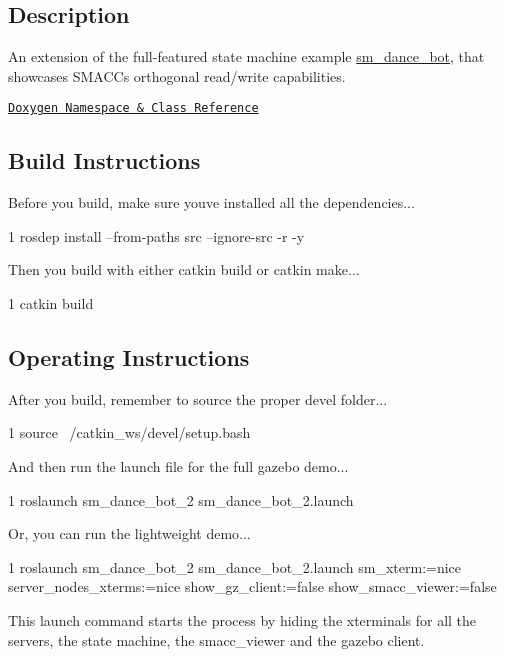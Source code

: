 \subsection*{Description}

An extension of the full-\/featured state machine example \hyperlink{namespacesm__dance__bot}{sm\+\_\+dance\+\_\+bot}, that showcases S\+M\+A\+CC\textquotesingle{}s orthogonal read/write capabilities.~\newline


\href{https://reelrbtx.github.io/SMACC_Documentation/master/html/namespacesm__dance__bot__2.html}{\tt Doxygen Namespace \& Class Reference}

\subsection*{Build Instructions}

Before you build, make sure you\textquotesingle{}ve installed all the dependencies...


\begin{DoxyCode}
1 rosdep install --from-paths src --ignore-src -r -y 
\end{DoxyCode}


Then you build with either catkin build or catkin make...


\begin{DoxyCode}
1 catkin build
\end{DoxyCode}
 \subsection*{Operating Instructions}

After you build, remember to source the proper devel folder...


\begin{DoxyCode}
1 source ~/catkin\_ws/devel/setup.bash
\end{DoxyCode}


And then run the launch file for the full gazebo demo...


\begin{DoxyCode}
1 roslaunch sm\_dance\_bot\_2 sm\_dance\_bot\_2.launch
\end{DoxyCode}


Or, you can run the lightweight demo...


\begin{DoxyCode}
1 roslaunch sm\_dance\_bot\_2 sm\_dance\_bot\_2.launch sm\_xterm:=nice server\_nodes\_xterms:=nice
       show\_gz\_client:=false show\_smacc\_viewer:=false
\end{DoxyCode}


This launch command starts the process by hiding the xterminals for all the servers, the state machine, the smacc\+\_\+viewer and the gazebo client. 